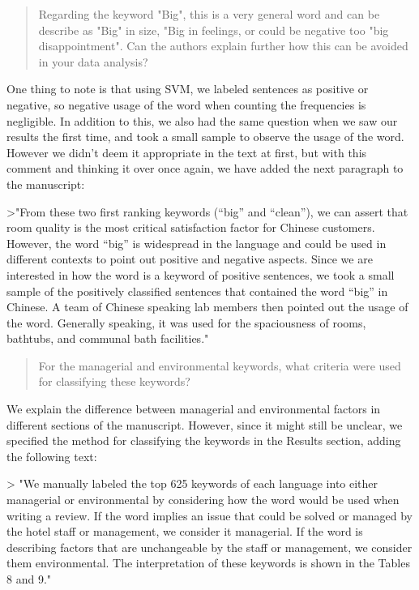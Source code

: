 \documentclass{letter}
\begin{document}
\begin{quotation}
Regarding the keyword "Big", this is a very general word and can be describe as "Big" in size, "Big in feelings, or could be negative too "big disappointment". Can the authors explain further how this can be avoided in your data analysis?
\end{quotation}

One thing to note is that using SVM, we labeled sentences as positive or negative, so negative usage of the word when counting the frequencies is negligible. In addition to this, we also had the same question when we saw our results the first time, and took a small sample to observe the usage of the word. However we didn't deem it appropriate in the text at first, but with this comment and thinking it over once again, we have added the next paragraph to the manuscript:

>"From these two first ranking keywords (“big” and “clean”), we can assert
that room quality is the most critical satisfaction factor for Chinese customers. However, the word “big” is widespread in the language and could be used in different contexts to point out positive and negative aspects. Since we are interested in how the word is a keyword of positive sentences, we took a small sample of the positively classified sentences that contained the word “big” in Chinese. A team of Chinese speaking lab members then pointed out the usage of the word. Generally speaking, it was used for the spaciousness of rooms, bathtubs, and communal bath facilities." 

\begin{quotation}
For the managerial and environmental keywords, what criteria were used for classifying these keywords? 
\end{quotation}

We explain the difference between managerial and environmental factors in different sections of the manuscript. However, since it might still be unclear, we specified the method for classifying the keywords in the Results section, adding the following text:

> "We manually labeled the top
625 keywords of each language into either managerial or environmental by considering how the word would be used when writing a review. If the word implies an issue that could be solved or managed by the hotel staff or management, we consider it managerial. If the word is describing factors that are unchangeable by the staff or management, we consider them environmental. The interpretation of these keywords is shown in the Tables 8 and 9."
\end{document}
